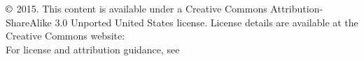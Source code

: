 \chapter*{}
\vfill


\noindent $\copyright$ 2015. This content is available under a Creative Commons Attribution-ShareAlike 3.0 Unported United States license. License details are available at the Creative Commons website:  \\

\noindent For license and attribution guidance, see 
